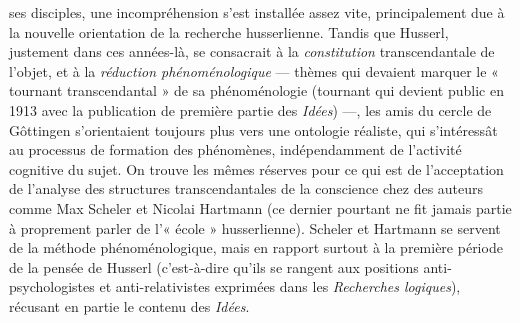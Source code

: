ses disciples, une incompréhension s’est
installée assez vite, principalement due à
la nouvelle orientation de la recherche
husserlienne. Tandis que Husserl, justement
dans ces années-là, se consacrait à
la {\it constitution} transcendantale de l’objet,
et à la {\it réduction phénoménologique}
— thèmes qui devaient marquer le « tournant
transcendantal » de sa phénoménologie
(tournant qui devient public en 1913
avec la publication de première partie des
{\it Idées}) —, les amis du cercle de Gôttingen
s’orientaient toujours plus vers une ontologie
réaliste, qui s’intéressât au processus
de formation des phénomènes, indépendamment
de l’activité cognitive du sujet.
On trouve les mêmes réserves pour ce qui
est de l’acceptation de l’analyse des structures
transcendantales de la conscience
chez des auteurs comme Max Scheler et
Nicolai Hartmann (ce dernier pourtant ne
fit jamais partie à proprement parler de
l'« école »  husserlienne). Scheler et
Hartmann se servent de la méthode phénoménologique,
mais en rapport surtout à
la première période de la pensée de Husserl
(c’est-à-dire qu’ils se rangent aux
positions anti-psychologistes et anti-relativistes
exprimées dans les {\it Recherches
logiques}), récusant en partie le contenu
des {\it Idées}.

